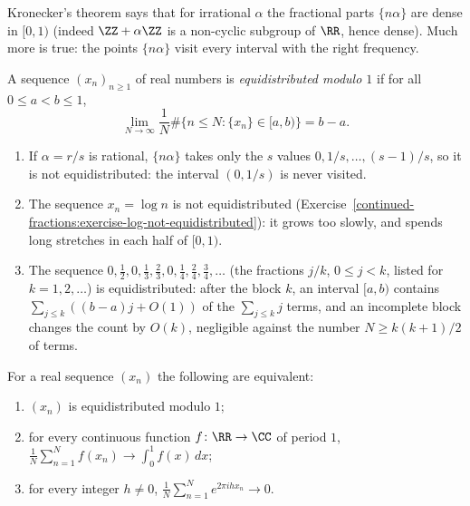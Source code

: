 Kronecker's theorem says that for irrational $\alpha$ the fractional parts $\{n\alpha\}$ are dense in $[0, 1)$ (indeed $\ZZ + \alpha\ZZ$ is a non-cyclic subgroup of $\RR$, hence dense). Much more is
true: the points $\{n\alpha\}$ visit every interval with the right frequency.

\begin{definition}\label{continued-fractions:definition-equidistributed}
A sequence $(x_n)_{n \geq 1}$ of real numbers is \emph{equidistributed modulo $1$} if for all $0 \leq a < b \leq 1$,
\[
\lim_{N \to \infty}\frac{1}{N}\#\{n \leq N : \{x_n\} \in [a, b)\} = b - a.
\]
\end{definition}

\begin{example}\label{continued-fractions:example-equidistribution}
\begin{enumerate}
\item If $\alpha = r/s$ is rational, $\{n\alpha\}$ takes only the $s$ values $0, 1/s, \ldots, (s - 1)/s$, so it is not equidistributed: the interval $(0, 1/s)$ is never visited.
\item The sequence $x_n = \log n$ is not equidistributed (Exercise~\ref{continued-fractions:exercise-log-not-equidistributed}): it grows too slowly, and spends long stretches in each half of $[0, 1)$.
\item The sequence $0, \frac12, 0, \frac13, \frac23, 0, \frac14, \frac24, \frac34, \ldots$ (the fractions $j/k$, $0 \leq j < k$, listed for $k = 1, 2, \ldots$) is equidistributed: after the block $k$, an
interval $[a, b)$ contains $\sum_{j \leq k}((b - a)j + O(1))$ of the $\sum_{j \leq k}j$ terms, and an incomplete block changes the count by $O(k)$, negligible against the number
$N \geq k(k + 1)/2$ of terms.
\end{enumerate}
\end{example}

\begin{theorem}\label{continued-fractions:theorem-weyl-criterion}
For a real sequence $(x_n)$ the following are equivalent:
\begin{enumerate}
\item $(x_n)$ is equidistributed modulo $1$;
\item for every continuous function $f \colon \RR \to \CC$ of period $1$, $\frac1N\sum_{n=1}^Nf(x_n) \to \int_0^1f(x)\,dx$;
\item for every integer $h \neq 0$, $\frac1N\sum_{n=1}^Ne^{2\pi ihx_n} \to 0$.
\end{enumerate}
\end{theorem}

